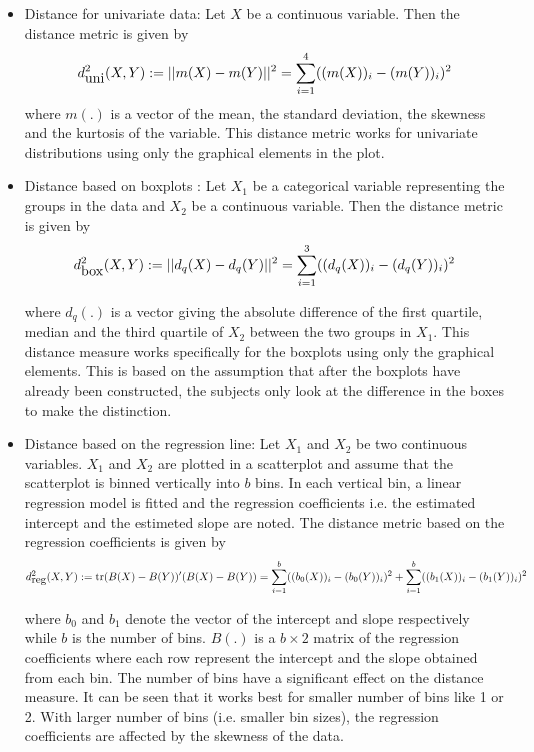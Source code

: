 \documentclass[12]{article}
\begin{document}
\begin{itemize}
\item Distance for univariate data: Let $X$ be a continuous variable. Then the distance metric is given by
\[
d^2_{\hbox{uni}}(X, Y) := ||m(X) - m(Y)||^2 = \sum_{i=1}^4 ((m(X))_i - (m(Y))_i)^2
\]
where $m(.)$ is a vector of the mean, the standard deviation, the skewness and the kurtosis of the variable. This distance metric works for univariate distributions using only the graphical elements in the plot.


\item Distance based on boxplots : Let $X_1$ be a categorical variable representing the groups in the data and $X_2$ be a continuous variable. Then the distance metric is given by
 \[
d^2_{\hbox{box}}(X, Y) := || d_q(X) - d_q(Y)||^2 = \sum_{i=1}^3 ((d_q(X))_i - (d_q(Y))_i)^2
\]

where $d_q(.)$ is a vector giving the absolute difference of the first quartile, median and the third quartile of $X_2$ between the two groups in $X_1$. This distance measure works specifically for the boxplots using only the graphical elements. This is based on the assumption that after the boxplots have already been constructed, the subjects only look at the difference in the boxes to make the distinction. 


\item Distance based on the regression line: Let $X_1$ and $X_2$ be two continuous variables. $X_1$ and $X_2$ are plotted in a scatterplot and assume that the scatterplot is binned vertically into $b$ bins. In each vertical bin, a linear regression model is fitted and the regression coefficients i.e. the estimated intercept and the estimeted slope are noted. The distance metric based on the regression coefficients is given by
 \[
d^2_{\hbox{reg}}(X, Y) := \hbox{tr} (B(X) - B(Y))' (B(X) - B(Y)) = \sum_{i=1}^b ((b_0(X))_i - (b_0(Y))_i)^2 + \sum_{i=1}^b ((b_1(X))_i - (b_1(Y))_i)^2
\]

where $b_0$ and $b_1$ denote the vector of the intercept and slope respectively while $b$ is the number of bins. $B(.)$ is a $b \times 2$ matrix of the regression coefficients where each row represent the  intercept and the slope obtained from each bin. The number of bins have a significant effect on the distance measure. It can be seen that it works best for smaller number of bins like 1 or 2. With larger number of bins (i.e. smaller bin sizes), the regression coefficients are affected by the skewness of the data.

\end{itemize}
\end{document}
